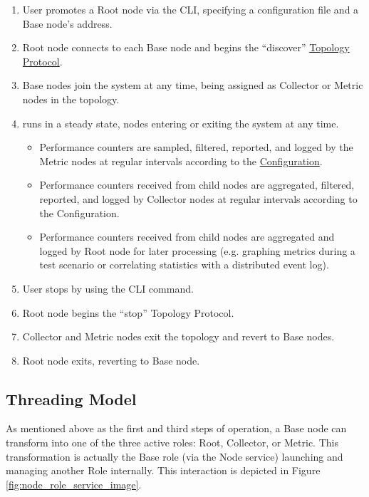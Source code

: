 \begin{enumerate}

\item User promotes a Root node via the \dcamp CLI, specifying a configuration file and a Base node's address.
\item Root node connects to each Base node and begins the ``discover'' \hyperref[proto_topo]{Topology Protocol}.
\item Base nodes join the \dcamp system at any time, being assigned as Collector or Metric nodes in the topology.

\item \dcamp runs in a steady state, nodes entering or exiting the system at any time.

      \begin{itemize}
      \item Performance counters are sampled, filtered, reported, and logged by the Metric nodes at regular intervals
            according to the \hyperref[configuration]{\dcamp Configuration}.
      \item Performance counters received from child nodes are aggregated, filtered, reported, and logged by Collector
            nodes at regular intervals according to the \dcamp Configuration.
      \item Performance counters received from child nodes are aggregated and logged by Root node for later processing
            (e.g. graphing metrics during a test scenario or correlating statistics with a distributed event log).
      \end{itemize}

\item User stops \dcamp by using the \dcamp CLI command.
\item Root node begins the ``stop'' Topology Protocol.
\item Collector and Metric nodes exit the topology and revert to Base nodes.
\item Root node exits, reverting to Base node.

\end{enumerate}

\subsection{Threading Model}

As mentioned above as the first and third steps of \dcamp operation, a Base node can transform into one of the three
active \dcamp roles: Root, Collector, or Metric. This transformation is actually the Base role (via the Node service)
launching and managing another Role internally. This interaction is depicted in Figure
\ref{fig:node_role_service_image}.

